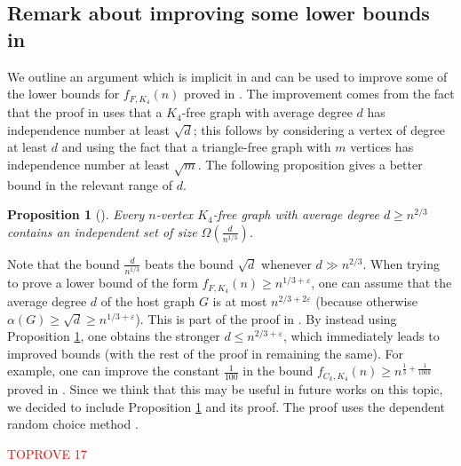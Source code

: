 \documentclass[11pt]{article}
\let\oldendproof\endproof
\renewenvironment{proof}[1][\proofname]{\oldproof[\bf #1]}{\oldendproof}
\theoremstyle{plain}
\newtheorem{proposition}[theorem]{Proposition}
\theoremstyle{definition}
\begin{document}
\subsection{Remark about improving some lower bounds in \cite{MV_general_graphs}}
We outline an argument which is implicit in \cite{Sudakov_DRC} and can be used to improve some of the lower bounds for
$f_{F,K_4}(n)$ proved in \cite{MV_general_graphs}. 
The improvement comes from the fact that the proof in \cite{MV_general_graphs} uses that a $K_4$-free graph with average degree $d$ has independence number at least $\sqrt{d}$; this follows by considering a vertex of degree at least $d$ and using the fact that a triangle-free graph with $m$ vertices has independence number at least $\sqrt{m}$. The following proposition gives a better bound in the relevant range of $d$.
\begin{proposition}[\cite{Sudakov_DRC}]\label{prop:DRC}
    Every $n$-vertex $K_4$-free graph with average degree $d \geq n^{2/3}$ contains an independent set of size $\Omega( \frac{d}{n^{1/3}})$.
\end{proposition}
\noindent
Note that the bound $\frac{d}{n^{1/3}}$ beats the bound $\sqrt{d}$ whenever $d \gg n^{2/3}$. When trying to prove a lower bound of the form $f_{F,K_4}(n) \geq n^{1/3 + \varepsilon}$, one can assume that the average degree $d$ of the host graph $G$ is at most $n^{2/3+2\varepsilon}$ (because otherwise $\alpha(G) \geq \sqrt{d} \geq n^{1/3+\varepsilon}$). This is part of the proof in \cite{MV_general_graphs}. By instead using Proposition \ref{prop:DRC}, one obtains the stronger $d \leq n^{2/3 + \varepsilon}$, which immediately leads to improved bounds (with the rest of the proof in \cite{MV_general_graphs} remaining the same). For example, one can improve the constant $\frac{1}{100}$ in the bound $f_{C_k,K_4}(n) \geq n^{\frac{1}{3} + \frac{1}{100k}}$ proved in \cite{MV_general_graphs}. Since we think that this may be useful in future works on this topic, we decided to include Proposition \ref{prop:DRC} and its proof. The proof uses the dependent random choice method \cite{FoxSudakov}.

\begin{proof}\textcolor{red}{TOPROVE 17}\end{proof}
\end{document}
